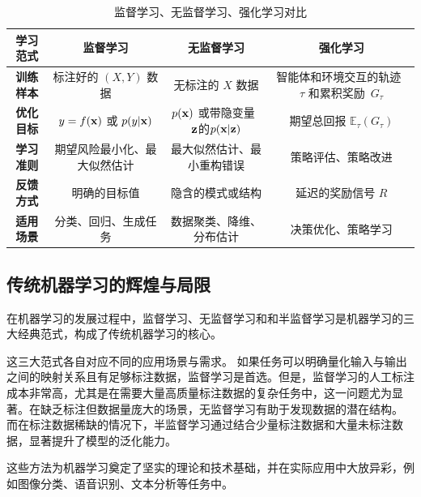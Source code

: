 \begin{table}[htbp]
\centering
\caption{监督学习、无监督学习、强化学习对比}
\begin{tabular}{|c|c|c|c|
}
\hline
{\bf 学习范式} & {\bf  监督学习} & {\bf 无监督学习} & {\bf 强化学习} \\
\hline
{\bf 训练样本} &  标注好的 $(X, Y)$ 数据  &  无标注的 $X$ 数据  &%
智能体和环境交互的轨迹~$\tau$ 和累积奖励~$G_\tau$  
 \\
\hline
{\bf 优化目标}  &  $y=f({\bf x})$ 或 $p(y|{\bf x})$  & $p({\bf x})$ 或带隐变量~${\bf z}$的$p({\bf x}|{\bf z})$ & 期望总回报 $\mathbb{E}_\tau(G_\tau)$ 
 \\
\hline
{\bf 学习准则} &  期望风险最小化、最大似然估计  & 最大似然估计、最小重构错误 & 策略评估、策略改进   \\
\hline
 {\bf 反馈方式}  & 明确的目标值  &隐含的模式或结构   &延迟的奖励信号 $R$   \\
\hline
  {\bf 适用场景} & 分类、回归、生成任务 &  数据聚类、降维、分布估计&决策优化、策略学习 \\
\hline
\end{tabular}
\label{tab:3learning}
\end{table}


%
%


\subsection{传统机器学习的辉煌与局限}
在机器学习的发展过程中，监督学习、无监督学习和和半监督学习是机器学习的三大经典范式，构成了传统机器学习的核心。

这三大范式各自对应不同的应用场景与需求。
如果任务可以明确量化输入与输出之间的映射关系且有足够标注数据，监督学习是首选。但是，监督学习的人工标注成本非常高，尤其是在需要大量高质量标注数据的复杂任务中，这一问题尤为显著。在缺乏标注但数据量庞大的场景，无监督学习有助于发现数据的潜在结构。
而在标注数据稀缺的情况下，半监督学习通过结合少量标注数据和大量未标注数据，显著提升了模型的泛化能力。

这些方法为机器学习奠定了坚实的理论和技术基础，并在实际应用中大放异彩，例如图像分类、语音识别、文本分析等任务中。

